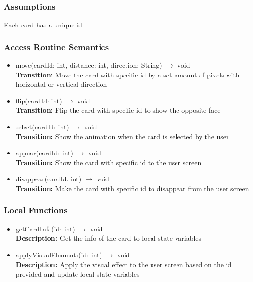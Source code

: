 \documentclass[12pt, titlepage]{article}
\begin{document}
\subsubsection{Assumptions}
\hspace{1.5em}Each card has a unique id


\subsubsection{Access Routine Semantics}

\begin{itemize}
\item move(cardId: int, distance: int, direction: String) $\rightarrow$ void\\
\textbf{Transition:} Move the card with specific id by a set amount of pixels with horizontal or vertical direction

\item flip(cardId: int) $\rightarrow$ void\\
\textbf{Transition:} Flip the card with specific id to show the opposite face

\item select(cardId: int) $\rightarrow$ void\\
\textbf{Transition:} Show the animation when the card is selected by the user

\item appear(cardId: int) $\rightarrow$ void\\
\textbf{Transition:} Show the card with specific id to the user screen

\item disappear(cardId: int) $\rightarrow$ void\\
\textbf{Transition:} Make the card with specific id to disappear from the user screen
\end{itemize}


\subsubsection{Local Functions}
\begin{itemize}
\item getCardInfo(id: int) $\rightarrow$ void\\
\textbf{Description:} Get the info of the card to local state variables
\item applyVisualElements(id: int) $\rightarrow$ void\\
\textbf{Description:} Apply the visual effect to the user screen based on the id provided and update local state variables
\end{itemize}
\end{document}
